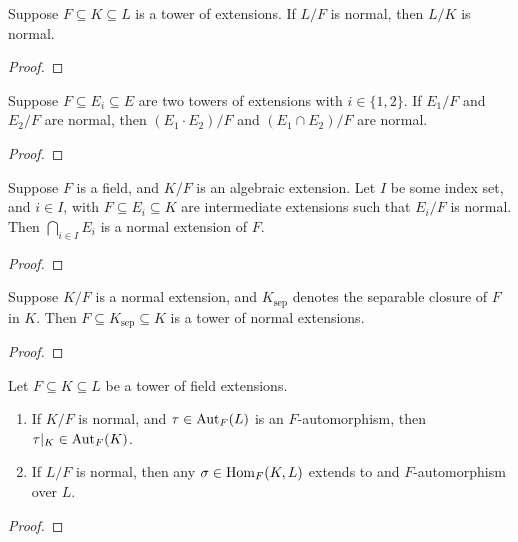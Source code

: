 \begin{theorem}
    Suppose \(F \subseteq K \subseteq L\) is a tower of extensions.
    If \(L/F\) is normal, then \(L/K\) is normal.
\end{theorem}
\begin{proof}
\end{proof}

\begin{lemma}
    Suppose \(F \subseteq E_i \subseteq E\) are two towers of extensions with \(i \in \{1,2\}\).
    If \(E_1/F\) and \(E_2/F\) are normal,
    then \((E_1 \cdot E_2)/F\) and \((E_1 \cap E_2)/F\) are normal.
\end{lemma}
\begin{proof}
\end{proof}
\begin{lemma}
    Suppose \(F\) is a field, and \(K/F\) is an algebraic extension.
    Let \(I\) be some index set, and \(i \in I\),
    with \(F \subseteq E_i \subseteq K\) are intermediate extensions
    such that \(E_i/F\) is normal.
    Then \(\bigcap_{i \in I} E_i\) is a normal extension of \(F\).
\end{lemma}
\begin{proof}
\end{proof}
\begin{lemma}
    Suppose \(K/F\) is a normal extension,
    and \(K_\text{sep}\) denotes the separable closure of \(F\) in \(K\).
    Then \(F \subseteq K_\text{sep} \subseteq K\) is a tower of normal extensions.
\end{lemma}
\begin{proof}
\end{proof}

\begin{proposition}
    Let \(F \subseteq K \subseteq L\) be a tower of field extensions.
    \begin{enumerate}[label={(\alph*)}, itemsep=0mm]
        \item If \(K/F\) is normal, and \(\tau \in \operatorname{Aut}_F(L)\) is an \(F\)-automorphism,
            then \(\tau\vert_K \in \operatorname{Aut}_F(K)\).
        \item If \(L/F\) is normal, then any \(\sigma \in \operatorname{Hom}_F(K,L)\)
            extends to and \(F\)-automorphism over \(L\).
    \end{enumerate}
\end{proposition}
\begin{proof}
\end{proof}

